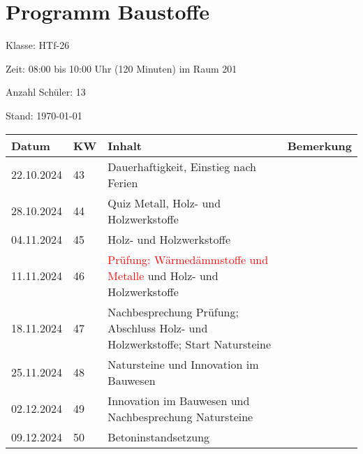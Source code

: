 \documentclass[
11pt,
captions=tableheading,
headings=big,
headsepline,
footsepline, 
captions=tableheading,
parskip=half-,
]{scrartcl}
\title{\fach}
\date{2024}
\newcommand{\klasse}{HTf-26\xspace}
\newcommand{\red}[1]{\textcolor{red}{#1}}
\begin{document}
\section*{Programm Baustoffe}

Klasse: \klasse

Zeit: 08:00 bis 10:00 Uhr (120 Minuten) im Raum 201

Anzahl Schüler: 13



Stand: \today

\vspace{0.75cm}



\begin{table}[H]
    \centering
    \begin{tabular}{llp{8.5cm}p{3.5cm}}
        \toprule
        \textbf{Datum} & \textbf{KW} & \textbf{Inhalt}                                                                & \textbf{Bemerkung}               \\
        \midrule
        22.10.2024     & 43          & Dauerhaftigkeit, Einstieg nach Ferien                                          & {}                               \\
        28.10.2024     & 44          & Quiz Metall, Holz- und Holzwerkstoffe                                          & {}                               \\
        04.11.2024     & 45          & Holz- und Holzwerkstoffe                                                       & {}                               \\
        11.11.2024     & 46          & \red{Prüfung: Wärmedämmstoffe und Metalle} und Holz- und Holzwerkstoffe        & {}                               \\
        18.11.2024     & 47          & Nachbesprechung Prüfung; Abschluss Holz- und Holzwerkstoffe; Start Natursteine & {}                               \\
        25.11.2024     & 48          & Natursteine  und Innovation im Bauwesen                                        & {}                               \\
        02.12.2024     & 49          & Innovation im Bauwesen und Nachbesprechung Natursteine                         & {}                               \\
        09.12.2024     & 50          & Betoninstandsetzung                                                            & {}                               \\

\end{tabular}
\end{table}
\end{document}
